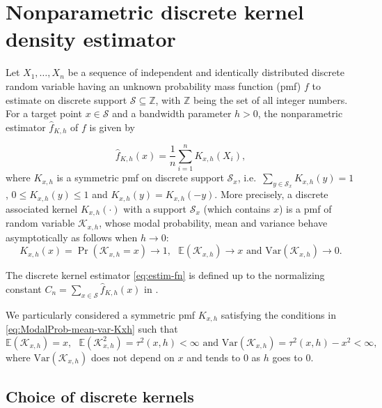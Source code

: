 \section{Nonparametric discrete kernel density estimator}\label{sec2-nonparametric-kernel-estimation}

Let \(X_{1}, \ldots, X_{n}\) be a sequence of independent and identically distributed discrete random variable having an unknown probability mass function (pmf) \(f\) to estimate on discrete support \(\mathcal{S}\subseteq \mathbb{Z}\), with \(\mathbb{Z}\) being the set of all integer numbers.
For a target point \(x\in\mathcal{S}\) and a bandwidth parameter \(h>0\), the nonparametric estimator \(\widehat{f}_{K,h}\) of \(f\) is given by

\begin{equation}
\widehat{f}_{K,h}(x)=\frac{1}{n}\sum_{i=1}^{n}K_{x,h}(X_{i}),
\label{eq:estim-fn}
\end{equation}
where \(K_{x,h}\) is a symmetric pmf on discrete support \(\mathcal{S}_{x}\), i.e.~\(\sum_{y\in\mathcal{S}_{x}}K_{x,h}(y)=1\), \(0\leq K_{x,h}(y)\leq 1\) and \(K_{x,h}(y)=K_{x,h}(-y)\). More precisely, a discrete associated kernel \(K_{x,h}(\cdot)\) with a support \(\mathcal{S}_{x}\) (which contains \(x\)) is a pmf of random variable \(\mathcal{K}_{x,h}\), whose modal probability, mean and variance behave asymptotically as follows when \(h\to 0\):
\begin{equation}
K_{x,h}(x)=\Pr(\mathcal{K}_{x,h}=x) \to 1, \text{ \ }\mathbb{E}(\mathcal{K}_{x,h}) \to x \text{ \ and\ } \text{Var}(\mathcal{K}_{x,h}) \to 0.
\label{eq:ModalProb-mean-var-Kxh}
\end{equation}

The discrete kernel estimator \eqref{eq:estim-fn} is defined up to the normalizing constant \(C_{n}=\sum_{x\in\mathcal{S}}\widehat{f}_{K,h}(x)\) in \citet{Senga2017}.

We particularly considered a symmetric pmf \(K_{x,h}\) satisfying the conditions in \eqref{eq:ModalProb-mean-var-Kxh} such that
\begin{equation} 
 \mathbb{E}(\mathcal{K}_{x,h}) =x, \text{ \ }\mathbb{E}(\mathcal{K}^{2}_{x,h}) =\tau^{2}(x,h)<\infty \text{ and } \text{Var}(\mathcal{K}_{x,h})=\tau^{2}(x,h)- x^{2}<\infty,  
\label{eq:condition-symm-kern}
\end{equation}
where \(\text{Var}(\mathcal{K}_{x,h})\) does not depend on \(x\) and tends to \(0\) as \(h\) goes to \(0\).

\subsection{Choice of discrete kernels}\label{choice-of-discrete-kernels}


